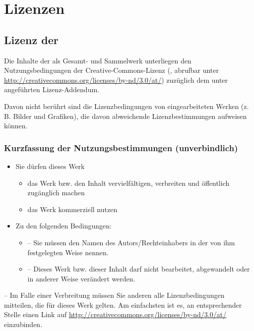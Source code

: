 \section{Lizenzen}

\subsection{Lizenz der \texorpdfstring{{\AASS}}{AASS}}

Die Inhalte der {\AASS} als Gesamt- und Sammelwerk unterliegen 
den Nutzungsbedingungen der Creative-Commons-Lizenz  (, 
abrufbar
unter
\url{http://creativecommons.org/licenses/by-nd/3.0/at/})
zuzüglich dem unter 
angeführten Lizenz-Addendum.

Davon nicht berührt sind die Lizenzbedingungen von eingearbeiteten Werken
(z.\,B. Bilder und Grafiken), die davon abweichende
Lizenzbestimmungen aufweisen können.

\subsubsection{Kurzfassung der Nutzungsbestimmungen (unverbindlich)}

\begin{itemize}
  \item Sie dürfen dieses Werk
  \begin{itemize}
    \item das Werk bzw. den Inhalt vervielfältigen, verbreiten und öffentlich zugänglich machen
    \item das Werk kommerziell nutzen
  \end{itemize}
  \item Zu den folgenden Bedingungen:
  \begin{itemize}
    \item {} -- Sie müssen den Namen des
    Autors/Rechteinhabers in der von ihm festgelegten Weise
    nennen.
    \item {} -- Dieses Werk bzw. dieser
    Inhalt darf nicht bearbeitet, abgewandelt oder in
    anderer Weise verändert werden.
  \end{itemize}
\end{itemize}
 -- Im Falle einer Verbreitung müssen Sie
anderen alle Lizenzbedingungen mitteilen, die für dieses
Werk gelten. Am einfachsten ist es, an entsprechender Stelle
einen Link auf \url{http://creativecommons.org/licenses/by-nd/3.0/at/} einzubinden.



